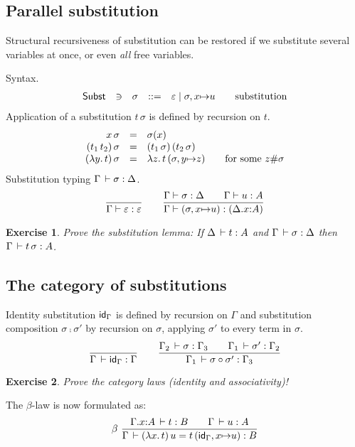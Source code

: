 \documentclass[a4paper,fleqn]{scrartcl}
\newtheorem{exercise}{Exercise}
\newcommand{\Subst}{\mathsf{Subst}}
\begin{document}
\subsection{Parallel substitution}

Structural recursiveness of substitution can be restored if we substitute several variables at once, or even \emph{all} free variables.

\noindent
Syntax.
\[
\begin{array}{lllrl@{\qquad}l}
\Subst & \ni & \sigma & ::= & \varepsilon \mid \sigma,x{\mapsto}u
  & \mbox{substitution} \\
\end{array}
\]
Application of a substitution $t\,\sigma$ is defined by recursion on $t$.
\[
\begin{array}{rll@{\qquad}l}
  x\,\sigma & = & \sigma(x) \\
  (t_1\,t_2)\,\sigma & = & (t_1\,\sigma)\,(t_2\,\sigma) \\
  (\lambda y.\,t)\,\sigma & = & \lambda z.\,t\,(\sigma, y{\mapsto}z)
    & \mbox{for some } z \# \sigma \\
\end{array}
\]
Substitution typing $\Gamma \,\vdash \sigma : \Delta$.
\[
  \dfrac{}{\Gamma \vdash \varepsilon : \varepsilon}
\qquad
  \dfrac{\Gamma \vdash \sigma : \Delta \qquad \Gamma \vdash u : A
     }{\Gamma \vdash (\sigma,x{\mapsto}u) : (\Delta.x{:}A)
     }
\]
\begin{exercise}
Prove the substitution lemma:
If $\Delta \,\vdash t : A$ and $\Gamma \,\vdash \sigma : \Delta$
then $\Gamma \,\vdash t\,\sigma : A$.
\end{exercise}


\subsection{The category of substitutions}

Identity substitution $\mathsf{id}_\Gamma$ is defined by recursion on $\Gamma$ and substitution composition $\sigma\comp\sigma'$ by recursion on $\sigma$, applying $\sigma'$ to every term in $\sigma$.
\[
  \dfrac{}{\Gamma \,\vdash \mathsf{id}_\Gamma : \Gamma}
  \qquad
  \dfrac{\Gamma_2 \,\vdash \sigma : \Gamma_3 \qquad
      \Gamma_1 \,\vdash \sigma' : \Gamma_2
    }{\Gamma_1 \,\vdash \sigma\circ\sigma' : \Gamma_3}
\]
\begin{exercise}
Prove the category laws (identity and associativity)!
\end{exercise}


The $\beta$-law is now formulated as:
\[
  \beta
    \ \dfrac{\Gamma.x{:}A \,\vdash t : B \qquad \Gamma \,\vdash u : A
    }{\Gamma \,\vdash (\lambda x.\,t)\,u = t\,(\mathsf{id}_\Gamma,x{\mapsto}u) : B
    }
\]
\end{document}
